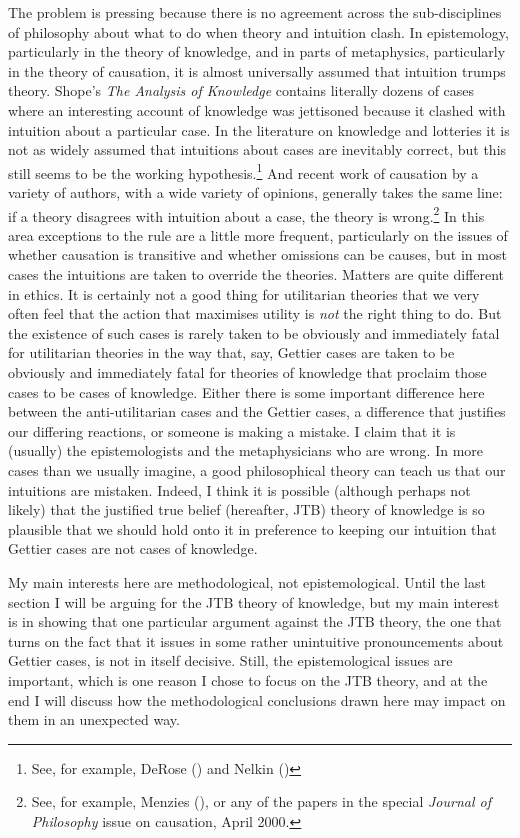 \documentclass[
  11pt,
  letterpaper,
  DIV=11,
  numbers=noendperiod,
  twoside]{scrartcl}
\begin{document}
The problem is pressing because there is no agreement across the
sub-disciplines of philosophy about what to do when theory and intuition
clash. In epistemology, particularly in the theory of knowledge, and in
parts of metaphysics, particularly in the theory of causation, it is
almost universally assumed that intuition trumps theory. Shope's
\emph{The Analysis of Knowledge} contains literally dozens of cases
where an interesting account of knowledge was jettisoned because it
clashed with intuition about a particular case. In the literature on
knowledge and lotteries it is not as widely assumed that intuitions
about cases are inevitably correct, but this still seems to be the
working hypothesis.\footnote{See, for example, DeRose
  () and Nelkin
  ()} And recent work of causation by a
variety of authors, with a wide variety of opinions, generally takes the
same line: if a theory disagrees with intuition about a case, the theory
is wrong.\footnote{See, for example, Menzies
  (), or any of the papers in the
  special \emph{Journal of Philosophy} issue on causation, April 2000.}
In this area exceptions to the rule are a little more frequent,
particularly on the issues of whether causation is transitive and
whether omissions can be causes, but in most cases the intuitions are
taken to override the theories. Matters are quite different in ethics.
It is certainly not a good thing for utilitarian theories that we very
often feel that the action that maximises utility is \emph{not} the
right thing to do. But the existence of such cases is rarely taken to be
obviously and immediately fatal for utilitarian theories in the way
that, say, Gettier cases are taken to be obviously and immediately fatal
for theories of knowledge that proclaim those cases to be cases of
knowledge. Either there is some important difference here between the
anti-utilitarian cases and the Gettier cases, a difference that
justifies our differing reactions, or someone is making a mistake. I
claim that it is (usually) the epistemologists and the metaphysicians
who are wrong. In more cases than we usually imagine, a good
philosophical theory can teach us that our intuitions are mistaken.
Indeed, I think it is possible (although perhaps not likely) that the
justified true belief (hereafter, JTB) theory of knowledge is so
plausible that we should hold onto it in preference to keeping our
intuition that Gettier cases are not cases of knowledge.

My main interests here are methodological, not epistemological. Until
the last section I will be arguing for the JTB theory of knowledge, but
my main interest is in showing that one particular argument against the
JTB theory, the one that turns on the fact that it issues in some rather
unintuitive pronouncements about Gettier cases, is not in itself
decisive. Still, the epistemological issues are important, which is one
reason I chose to focus on the JTB theory, and at the end I will discuss
how the methodological conclusions drawn here may impact on them in an
unexpected way.
\end{document}
